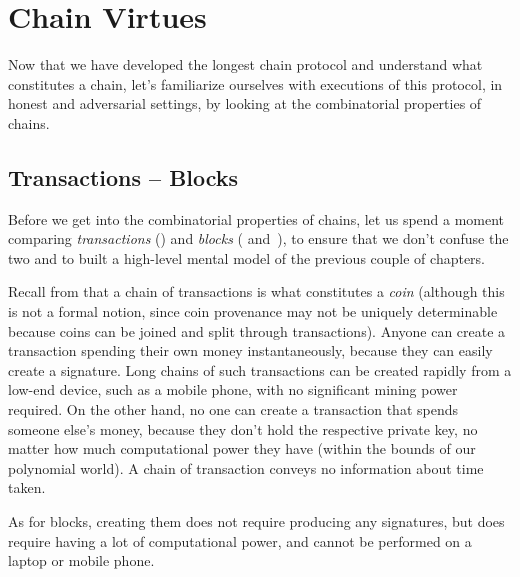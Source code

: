 \chapter{Chain Virtues}\label{chapter.virtues}

Now that we have developed the longest chain protocol and understand
what constitutes a chain, let's familiarize ourselves with executions
of this protocol, in honest and adversarial settings, by looking at
the combinatorial properties of chains.

\section{Transactions -- Blocks}

Before we get into the combinatorial properties of chains, let us spend a moment
comparing \emph{transactions} () and \emph{blocks}
( and~), to ensure
that we don't confuse the two and to built a high-level mental model of the
previous couple of chapters.

Recall from  that a chain of transactions is what constitutes
a \emph{coin} (although this is not a formal notion, since coin provenance may not be uniquely
determinable because coins can be joined and split through transactions).
Anyone can create a transaction spending their own money instantaneously, because
they can easily create a signature. Long chains of such transactions can be created rapidly
from a low-end device, such as a mobile phone, with no significant mining power required.
On the other hand, no one can create a transaction that spends someone else's money,
because they don't hold the respective private key, no matter how much computational
power they have (within the bounds of our polynomial world). A chain of transaction
conveys no information about time taken.

As for blocks, creating them does not require producing any signatures, but does require
having a lot of computational power, and cannot be performed on a laptop or mobile phone.

